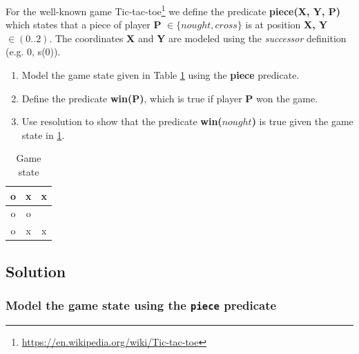 \documentclass[10pt, a4paper]{article}
\begin{document}
\begin{enumerate}
\begin{table}[H]
\begin{tabularx}{\textwidth}{X | c | X}
            
        \end{tabularx}
    \end{table}
	
\end{enumerate}


\pagebreak
For the well-known game Tic-tac-toe\footnote{\url{https://en.wikipedia.org/wiki/Tic-tac-toe}} we define
the predicate \textbf{piece({\color{green}X}, {\color{blue}Y}, {\color{red}P})} which  states that a piece of player \textbf{\color{red}P} $\in \{ nought, cross\}$ is at position \textbf{X, Y} $\in (0..2)$. The coordinates \textbf{X} and \textbf{Y} are modeled using the \textit{successor} definition (e.g. 0, s(0)).
\begin{enumerate}
    \item Model the game state given in Table \ref{tab:game_state} using the \textbf{piece} predicate.
    \item Define the predicate \textbf{win({\color{red}P})}, which is true if player \textbf{{\color{red}P}} won the game.
    \item Use resolution to show that the predicate \textbf{win($nought$)} is true given the game state in \ref{tab:game_state}.
\end{enumerate}
\begin{table}[h]\large
    \centering
    \begin{tabular}{c|c|c}
         o & x & x \\ \hline
         o & o &   \\ \hline
         o & x & x
    \end{tabular}
    \caption{Game state}
    \label{tab:game_state}
\end{table}

\subsection*{Solution}

\subsubsection{Model the game state using the \texttt{piece} predicate}
\end{document}
